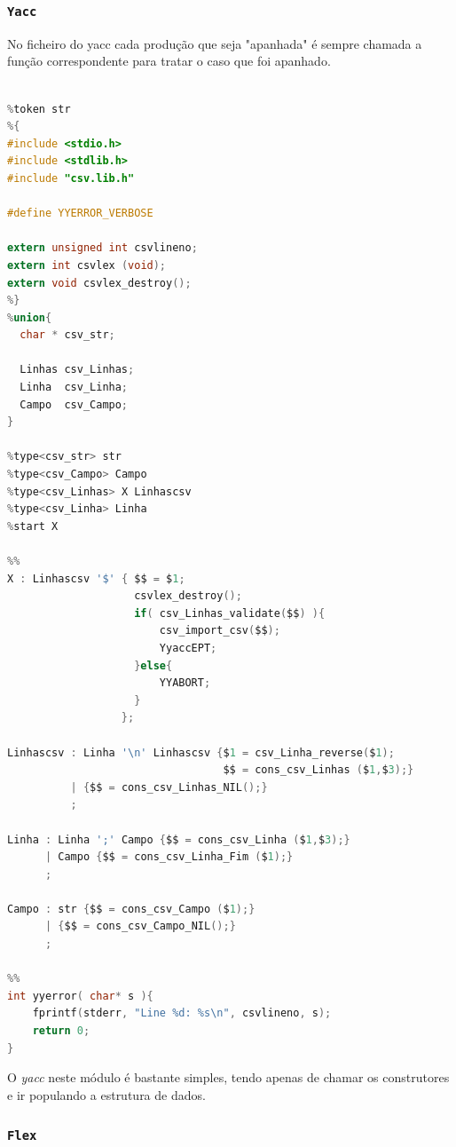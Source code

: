 \documentclass[11pt, a4paper, oneside]{article}
\begin{document}
\newpage
\subsubsection[Yacc]{\texttt{Yacc}}
No ficheiro do \textsf{yacc} cada produção que seja "apanhada" é sempre chamada a função correspondente para tratar o caso que foi apanhado.

\begin{lstlisting}[language=C, caption={Yacc do ficheiro de resultados.}]

%token str
%{
#include <stdio.h>
#include <stdlib.h>
#include "csv.lib.h"

#define YYERROR_VERBOSE

extern unsigned int csvlineno;
extern int csvlex (void);
extern void csvlex_destroy();
%}
%union{
  char * csv_str;
  
  Linhas csv_Linhas;
  Linha  csv_Linha;
  Campo  csv_Campo;
} 

%type<csv_str> str
%type<csv_Campo> Campo
%type<csv_Linhas> X Linhascsv
%type<csv_Linha> Linha
%start X

%%
X : Linhascsv '$' { $$ = $1; 
                    csvlex_destroy();
                    if( csv_Linhas_validate($$) ){
                        csv_import_csv($$);
                        YyaccEPT;
                    }else{
                        YYABORT;
                    }
                  };

Linhascsv : Linha '\n' Linhascsv {$1 = csv_Linha_reverse($1);
                                  $$ = cons_csv_Linhas ($1,$3);}
          | {$$ = cons_csv_Linhas_NIL();}
          ;

Linha : Linha ';' Campo {$$ = cons_csv_Linha ($1,$3);}
      | Campo {$$ = cons_csv_Linha_Fim ($1);}
      ;

Campo : str {$$ = cons_csv_Campo ($1);}
      | {$$ = cons_csv_Campo_NIL();}
      ;

%%
int yyerror( char* s ){
    fprintf(stderr, "Line %d: %s\n", csvlineno, s);
    return 0;
}
\end{lstlisting}

O \emph{yacc} neste módulo é bastante simples, tendo apenas de chamar os construtores e ir populando a estrutura de dados.

\newpage
\subsubsection[Flex]{\texttt{Flex}}
\end{document}
